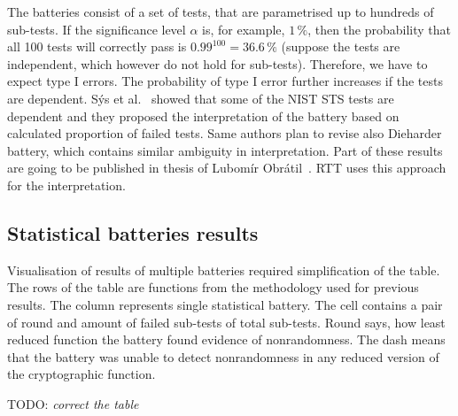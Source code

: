 \documentclass[
  print, %
  Table,   %
  nolof,     %
  nolot,     %
  11pt, %
  oneside  %
]{fithesis3}
\newcommand{\todo}[1]{TODO: \textit{#1}}
\begin{document}
The batteries consist of a set of tests, that are parametrised up to hundreds of sub-tests. If the significance level $\alpha$ is, for example, $1\,\%$, then the probability that all 100 tests will correctly pass is $0.99^{100}=36.6\,\%$ (suppose the tests are independent, which however do not hold for sub-tests). Therefore, we have to expect type I errors. The probability of type I error further increases if the tests are dependent. Sýs et al.~\cite{sys2015interpretation} showed that some of the NIST STS tests are dependent and they proposed the interpretation of the battery based on calculated proportion of failed tests. Same authors plan to revise also Dieharder battery, which contains similar ambiguity in interpretation. Part of these results are going to be published in thesis of Lubomír Obrátil~\cite{obratilMgrThesis}. RTT uses this approach for the interpretation.

\subsection{Statistical batteries results}
\label{subsec:relatwork-stat-res}

Visualisation of results of multiple batteries required simplification of the table. The rows of the table are functions from the methodology used for previous results. The column represents single statistical battery. The cell contains a pair of round and amount of failed sub-tests of total sub-tests. Round says, how least reduced function the battery found evidence of nonrandomness. The dash means that the battery was unable to detect nonrandomness in any reduced version of the cryptographic function.

\todo{correct the table}
\end{document}
